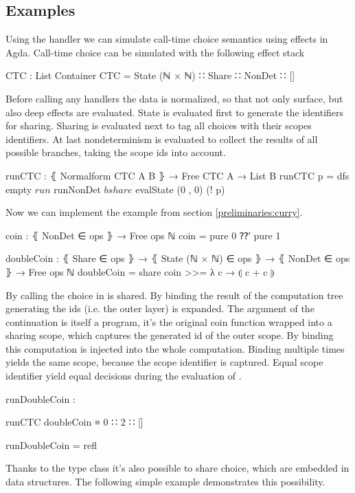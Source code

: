 \subsection{Examples}

Using the handler we can simulate call-time choice semantics using effects in
Agda.
Call-time choice can be simulated with the following effect stack

\begin{code}
CTC : List Container
CTC = State (ℕ × ℕ) ∷ Share ∷ NonDet ∷ []
\end{code}
Before calling any handlers the data is normalized, so that not only surface,
but also deep effects are evaluated.
State is evaluated first to generate the identifiers for sharing.
Sharing is evaluated next to tag all choices with their scopes identifiers.
At last nondeterminism is evaluated to collect the results of all possible
branches, taking the scope ids into account.

\begin{code}
runCTC : ⦃ Normalform CTC A B ⦄ → Free CTC A → List B
runCTC p = dfs empty $ run $ runNonDet $ bshare $ evalState (0 , 0) (! p)
\end{code}
Now we can implement the  example from section
\ref{preliminaries:curry}.

\begin{code}
coin : ⦃ NonDet ∈ ops ⦄ → Free ops ℕ
coin = pure 0 ⁇′ pure 1

doubleCoin : ⦃ Share ∈ ops ⦄ → ⦃ State (ℕ × ℕ) ∈ ops ⦄ → ⦃ NonDet ∈ ops ⦄ →
  Free ops ℕ
doubleCoin = share coin >>= λ c → ⦇ c + c ⦈
\end{code}
By calling  the choice in  is shared.
By binding the result of  the computation tree generating
the ids (i.e. the outer layer) is expanded.
The argument of the continuation  is itself a program, it's the
original coin function wrapped into a sharing scope, which captures the
generated id of the outer scope.
By binding  this computation is injected into the whole
computation.
Binding  multiple times yields the same scope, because the scope
identifier is captured.
Equal scope identifier yield equal decisions during the evaluation of
.

\begin{center}
\begin{code}
runDoubleCoin :
\end{code}
\begin{code}[inline]
 runCTC doubleCoin ≡ 0 ∷ 2 ∷ []
\end{code}
\begin{code}
runDoubleCoin = refl
\end{code}
\end{center}
Thanks to the  type class it's also possible to share
choice, which are embedded in data structures.
The following simple example demonstrates this possibility.

